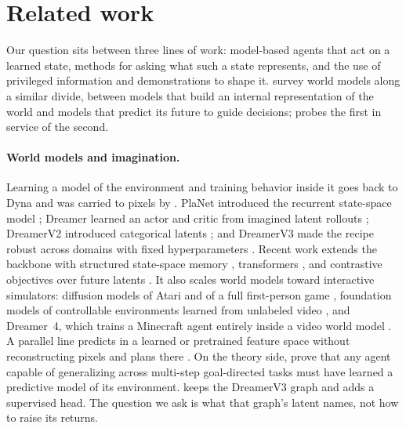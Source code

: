 \section{Related work}
\label{sec:related}

Our question sits between three lines of work: model-based agents that act on a learned state, methods for asking what such a state represents, and the use of privileged information and demonstrations to shape it.
\citet{ding2025survey} survey world models along a similar divide, between models that build an internal representation of the world and models that predict its future to guide decisions; \method{} probes the first in service of the second.

\paragraph{World models and imagination.}
Learning a model of the environment and training behavior inside it goes back to Dyna \citep{sutton1991dyna} and was carried to pixels by \citet{ha2018worldmodels}.
PlaNet introduced the recurrent state-space model \citep{hafner2019planet}; Dreamer learned an actor and critic from imagined latent rollouts \citep{hafner2020dreamer}; DreamerV2 introduced categorical latents \citep{hafner2021dreamerv2}; and DreamerV3 made the recipe robust across domains with fixed hyperparameters \citep{hafner2023dreamerv3,hafner2025dreamerv3nature}.
Recent work extends the backbone with structured state-space memory \citep{samsami2024r2i}, transformers \citep{micheli2023iris,zhang2023storm}, and contrastive objectives over future latents \citep{burchi2025twister}.
It also scales world models toward interactive simulators: diffusion models of Atari and of a full first-person game \citep{alonso2024diamond,valevski2025gamengen}, foundation models of controllable environments learned from unlabeled video \citep{bruce2024genie}, and Dreamer~4, which trains a Minecraft agent entirely inside a video world model \citep{hafner2025dreamer4}.
A parallel line predicts in a learned or pretrained feature space without reconstructing pixels and plans there \citep{schrittwieser2020muzero,hansen2024tdmpc2,zhou2025dinowm,assran2025vjepa2}.
On the theory side, \citet{richens2025general} prove that any agent capable of generalizing across multi-step goal-directed tasks must have learned a predictive model of its environment.
\method{} keeps the DreamerV3 graph and adds a supervised head. The question we ask is what that graph's latent names, not how to raise its returns.

